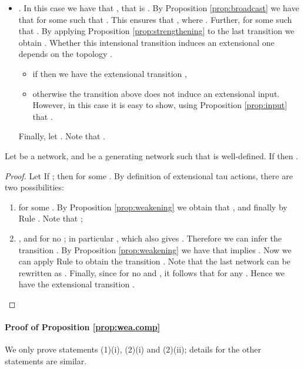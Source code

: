 \documentclass{LMCS}
\begin{document}
\begin{enumerate}
\begin{itemize}
	\item . In this case we have that , that is 
	. By Proposition \ref{prop:broadcast} 
	we have that  for some  such that 
	. This ensures that , where 
	. Further,  for some  such that 
	. 
	By applying Proposition \ref{prop:strengthening} to the last transition 
	we obtain . Whether this intensional 
	transition induces an extensional one depends on the topology 
	. 
		\begin{itemize}
		\item if  then we have the 
		extensional transition , 
		\item otherwise the transition above does not induce an extensional 
		input. However, in this case it is easy to show, using Proposition 
		\ref{prop:input} that . 
		\end{itemize}
	Finally, let . Note that 
	.
	\end{itemize}
\end{enumerate} 


\begin{lem}
\label{lem:tau.strong}
Let  be a network, and  be a generating network such that 
 is well-defined. 
If  then 
.
\end{lem} 
\begin{proof}
Let 
If ; then  
for some . By definition of extensional 
tau actions, there are two possibilities: 
\begin{enumerate}
\item  for some . 
By Proposition \ref{prop:weakening} we obtain that 
, and 
finally  by Rule 
.
Note that ; 
\item , and  for 
no ; in particular , which 
also gives . Therefore 
we can infer the transition . 
By Proposition \ref{prop:weakening} we have that 
 implies 
. 
Now we can apply Rule  to obtain the transition 
. 
Note that the last network can be rewritten as . Finally, since  for no 
 and , it follows that 
 for any . Hence we have 
the extensional transition 
. 

\end{enumerate}
\end{proof}

\paragraph{\textbf{Proof of Proposition \ref{prop:wea.comp}}}
\label{proof:composition}
We only prove statements (1)(i), (2)(i) and (2)(ii); details for the other statements 
are similar.
\end{document}
